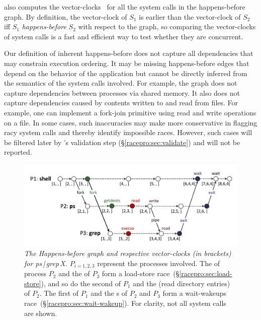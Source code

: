 \racepro also computes the vector-clocks~\cite{vectorclock} for all the
system calls in the happens-before graph.  By definition, the
vector-clock of $S_1$ is earlier than the vector-clock of $S_2$ iff
$S_1$ \emph{happens-before} $S_2$ with respect to the graph, so comparing
the vector-clocks of system calls is a fast and efficient way to test
whether they are concurrent.

Our definition of inherent happens-before does not capture all
dependencies that may constrain execution ordering. It may be missing
happens-before edges that depend on the behavior of the application
but cannot be directly inferred from the semantics of the system calls
involved. For example, the graph does not capture dependencies between
processes via shared memory. It also does not capture dependencies
caused by contents written to and read from files. For example, one
can implement a fork-join primitive using read and write operations on
a file.  In some cases, such inaccuracies may make \racepro more
conservative in flagging racy system calls and thereby identify
impossible races.  However, such cases will be filtered later by
\racepro's validation step (\S\ref{racepro:sec:validate}) and will not be reported.

\begin{figure}[]
\centering
\includegraphics[width=\linewidth]{figures/racepro/psgrep}
\caption{{\em The Happens-before graph and respective vector-clocks
  (in brackets) for ps\,|\,grep\,X.} $P_{i=1,2,3}$ represent the processes
  involved. The  of process $P_2$ and the  of
  $P_3$ form a load-store race~(\S\ref{racepro:sec:load-store}), and so do the
  second  of $P_1$ and the  (read directory entries) of $P_2$. The first
   of $P_1$ and the s of $P_2$ and $P_3$ form a
  wait-wakeups race~(\S\ref{racepro:sec:wait-wakeup}). For clarity, not all
  system calls are shown.} \label{racepro:fig:psgrep}
\end{figure}

